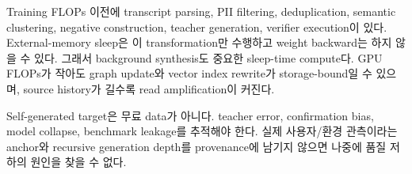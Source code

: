 Training FLOPs 이전에 transcript parsing, PII filtering, deduplication, semantic clustering,
negative construction, teacher generation, verifier execution이 있다. External-memory sleep은
이 transformation만 수행하고 weight backward는 하지 않을 수 있다. 그래서 background
synthesis도 중요한 sleep-time compute다. GPU FLOPs가 작아도 graph update와 vector index
rewrite가 storage-bound일 수 있으며, source history가 길수록 read amplification이 커진다.

\begin{cautionbox}
Self-generated target은 무료 data가 아니다. teacher error, confirmation bias, model collapse,
benchmark leakage를 추적해야 한다. 실제 사용자/환경 관측이라는 anchor와 recursive generation
depth를 provenance에 남기지 않으면 나중에 품질 저하의 원인을 찾을 수 없다.
\end{cautionbox}
